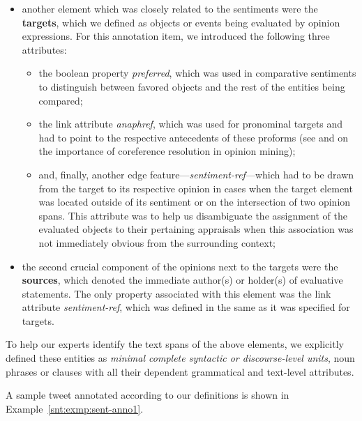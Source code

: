 \begin{itemize}
\item
  another element which was closely related to the sentiments were the
  \textbf{targets}, which we defined as objects or events being
  evaluated by opinion expressions.  For this annotation item, we
  introduced the following three attributes:
  \begin{itemize}
    \item
      the boolean property \emph{preferred}, which was used in
      comparative sentiments to distinguish between favored objects
      and the rest of the entities being compared;
    \item
      the link attribute \emph{anaphref}, which was used for
      pronominal targets and had to point to the respective
      antecedents of these proforms (see \citet{Stoyanov:06} and
      \citet{Ding:10} on the importance of coreference resolution in
      opinion mining);
    \item and, finally, another edge
      feature---\emph{sentiment-ref}---which had to be drawn from the
      target to its respective opinion in cases when the target
      element was located outside of its sentiment or on the
      intersection of two opinion spans.  This attribute was to help
      us disambiguate the assignment of the evaluated objects to their
      pertaining appraisals when this association was not immediately
      obvious from the surrounding context;
  \end{itemize}

\item
  the second crucial component of the opinions next to the targets
  were the \textbf{sources}, which denoted the immediate author(s) or
  holder(s) of evaluative statements.  The only property associated
  with this element was the link attribute \emph{sentiment-ref}, which
  was defined in the same as it was specified for targets.
\end{itemize}

To help our experts identify the text spans of the above elements, we
explicitly defined these entities as \emph{minimal complete syntactic
  or discourse-level units}, \ie{} noun phrases or clauses with all
their dependent grammatical and text-level attributes.

A sample tweet annotated according to our definitions is shown in
Example~\ref{snt:exmp:sent-anno1}.

\begin{example}\label{snt:exmp:sent-anno1}
  \upshape{}\\[0.8em]
  \noindent{}
\end{example}


